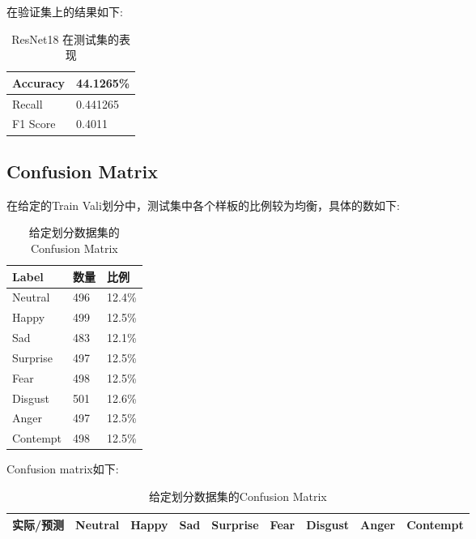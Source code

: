 \documentclass[11pt, a4paper]{article}
\begin{document}
\begin{CJK}{UTF8}{gbsn}
在验证集上的结果如下:

\begin{table}[htbp] 
	\begin{center}
		\caption{ResNet18 在测试集的表现}
		\begin{tabular}{l | l}  \hline
			Accuracy  &  44.1265\%  \\ \hline
			Recall        &  0.441265 \\ \hline
			F1 Score    & 0.4011 \\ \hline
		\end{tabular}
		\label{tab:res18_test}
	\end{center}
\end{table}	

\subsection{Confusion Matrix}

在给定的Train Vali划分中，测试集中各个样板的比例较为均衡，具体的数如下:

\begin{table}[htbp] 
	\begin{center}
		\caption{给定划分数据集的Confusion Matrix}
		\begin{tabular}{ | l | l | l |  }  \hline
		Label & 数量 & 比例 \\ \hline
		Neutral  & 496   & 12.4\%    \\ \hline
		Happy  &  499 & 12.5\%  \\ \hline
		Sad   &  483  &  12.1\%  \\ \hline
		Surprise  & 497  & 12.5\%  \\ \hline
		Fear   &  498 &  12.5\% \\ \hline
		Disgust   &  501  &   12.6\%  \\ \hline
		Anger     &   497 & 12.5\%   \\ \hline
		Contempt   & 498   & 12.5\%   \\ \hline
		\end{tabular}
		\label{tab:occu}
	\end{center}
\end{table}	

Confusion matrix如下:
\begin{table}[htbp] 
	\begin{center}
		\caption{给定划分数据集的Confusion Matrix}
		\begin{tabular}{ | l | l | l | l | l |l | l |l | l | }  \hline
			实际/预测 &  Neutral  & Happy & Sad   &  Surprise   &  Fear  & Disgust  & Anger & Contempt  \\ \hline
			

\end{tabular}
\end{center}
\end{table}
\end{CJK}
\end{document}
